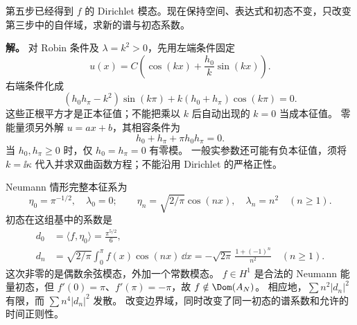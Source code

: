 \begin{exbox}
第五步已经得到 $f$ 的 Dirichlet 模态。现在保持空间、表达式和初态不变，只改变第三步中的自伴域，求新的谱与初态系数。

\textbf{解。} 对 Robin 条件及 $\lambda=k^2>0$，先用左端条件固定
\[
 u(x)=C\left(\cos(kx)+\frac{h_0}{k}\sin(kx)\right).
\]
右端条件化成
\[
 (h_0h_\pi-k^2)\sin(k\pi)
 +k(h_0+h_\pi)\cos(k\pi)=0.
\]
这些正根平方才是正本征值；不能把乘以 $k$ 后自动出现的 $k=0$ 当成本征值。
零能量须另外解 $u=ax+b$，其相容条件为
\[
 h_0+h_\pi+\pi h_0h_\pi=0.
\]
当 $h_0,h_\pi\ge0$ 时，仅 $h_0=h_\pi=0$ 有零模。
一般实参数还可能有负本征值，须将 $k=\ii\kappa$ 代入并求双曲函数方程；不能沿用 Dirichlet 的严格正性。

Neumann 情形完整本征系为
\[
 \eta_0=\pi^{-1/2},\quad \lambda_0=0;
 \qquad \eta_n=\sqrt{2/\pi}\cos(nx),\quad\lambda_n=n^2\quad(n\ge1).
\]
初态在这组基中的系数是
\begin{align*}
 d_0&=\langle f,\eta_0\rangle=\frac{\pi^{5/2}}6,\\
 d_n&=\sqrt{2/\pi}\int_0^\pi f(x)\cos(nx)\,\dd x
 =-\sqrt{2\pi}\,\frac{1+(-1)^n}{n^2}\quad(n\ge1).
\end{align*}
这次非零的是偶数余弦模态，外加一个常数模态。
$f\in H^1$ 是合法的 Neumann 能量初态，但 $f'(0)=\pi$、$f'(\pi)=-\pi$，故 $f\notin\Dom(A_N)$。
相应地，$\sum n^2|d_n|^2$ 有限，而 $\sum n^4|d_n|^2$ 发散。
改变边界域，同时改变了同一初态的谱系数和允许的时间正则性。
\end{exbox}

